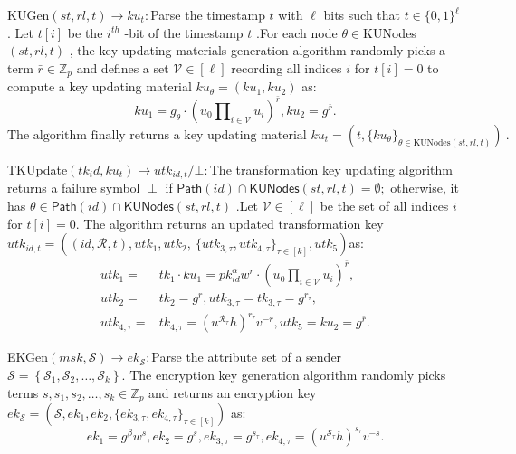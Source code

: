 \documentclass[runningheads]{llncs}
\begin{document}
KUGen$(st,rl,t)\to ku_t:$Parse the timestamp $t$ with $\ell$ bits such that $t\in\{0,1\}^\ell$ . Let $t[i]$ be the $i^{th}$ -bit of the timestamp $t$ .For each node $\theta\in$KUNodes$(st,rl,t)$ , the key updating materials generation algorithm randomly picks a term $\bar{r}\in\mathbb{Z}_p$ and defines a set $\mathcal{V}\in[\ell]$ recording all indices $i$ for $t[i]=0$ to compute a key updating material $ku_\theta=(ku_1,ku_2)$ as:
\begin{equation*} ku_{1}=g_\theta \cdot \left({u_{0}\prod \nolimits _{i\in \mathcal {V}}u_{i}}\right)^{\bar {r}}, ku_{2}=g^{\bar {r}}.\end{equation*}
$\text{The algorithm finally returns a key updating material }ku_t=(t,\{ku_\theta\}_{\theta\in\mathrm{KUNodes}(st,rl,t)})\mathrm{~.}$

TKUpdate$(tk_id,ku_t)\to utk_{id,t}/\bot:$The transformation key updating algorithm returns a failure symbol $\perp$ if $\mathsf{Path}(id)\cap\mathsf{KUNodes}(st,rl,t)=\emptyset;$ otherwise, it has $\theta\in\mathsf{Path}(id)\cap\mathsf{KUNodes}(st,rl,t)$ .Let $\mathcal{V}\in[\ell]$ be the set of all indices $i$ for $t[i]=0.$ The algorithm returns an updated transformation key $utk_{id,t}=\left((id,\mathcal{R},t),utk_1,utk_2,\:\{utk_{3,\tau},utk_{4,\tau}\}_{\tau\in[k]},utk_5\right)$as:
\begin{align*} utk_{1}=&tk_{1}\cdot ku_{1}=pk_{id}^\alpha w^{r} \cdot \left({u_{0}\prod \nolimits _{i\in \mathcal {V}}u_{i}}\right)^{\bar {r}},\\ utk_{2}=&tk_{2}=g^{r},utk_{3,\tau }=tk_{3,\tau }=g^{r_\tau },\\ utk_{4,\tau }=&tk_{4,\tau }=(u^{\mathcal {R}_\tau }h)^{r_\tau }v^{-r},utk_{5} =ku_{2}=g^{\bar {r}}.\end{align*}

EKGen$(msk,\mathcal{S})\to ek_\mathcal{S}:$Parse the attribute set of a sender $\mathcal{S}=\left\{\mathcal{S}_1,\mathcal{S}_2,\ldots,\mathcal{S}_k\right\}.$ The encryption key generation algorithm randomly picks terms $s,s_1,s_2,\ldots,s_k\in\mathbb{Z}_p$ and returns an encryption key $ek_{\mathcal{S}}=(\mathcal{S},ek_1,ek_2,\{ek_{3,\tau},ek_{4,\tau}\}_{\tau\in[k]})$ as:
\begin{equation*} ek_{1}=g^\beta w^{s}, ek_{2}=g^{s}, ek_{3,\tau }=g^{s_\tau }, ek_{4,\tau }=(u^{\mathcal {S}_\tau }h)^{s_\tau }v^{-s}.\end{equation*}
\end{document}
